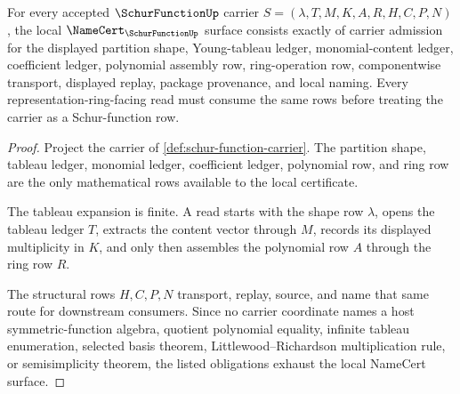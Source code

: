 \begin{theorem}
\label{thm:schur-function-namecert-obligations}
For every accepted $\SchurFunctionUp$ carrier $S=(\lambda,T,M,K,A,R,H,C,P,N)$, the local $\NameCert_{\SchurFunctionUp}$ surface consists exactly of carrier admission for the displayed partition shape, Young-tableau ledger, monomial-content ledger, coefficient ledger, polynomial assembly row, ring-operation row, componentwise transport, displayed replay, package provenance, and local naming. Every representation-ring-facing read must consume the same rows before treating the carrier as a Schur-function row.
\end{theorem}
\begin{proof}
Project the carrier of \autoref{def:schur-function-carrier}. The partition shape, tableau ledger, monomial ledger, coefficient ledger, polynomial row, and ring row are the only mathematical rows available to the local certificate.

The tableau expansion is finite. A read starts with the shape row $\lambda$, opens the tableau ledger $T$, extracts the content vector through $M$, records its displayed multiplicity in $K$, and only then assembles the polynomial row $A$ through the ring row $R$.

The structural rows $H,C,P,N$ transport, replay, source, and name that same route for downstream consumers. Since no carrier coordinate names a host symmetric-function algebra, quotient polynomial equality, infinite tableau enumeration, selected basis theorem, Littlewood--Richardson multiplication rule, or semisimplicity theorem, the listed obligations exhaust the local NameCert surface.
\end{proof}

